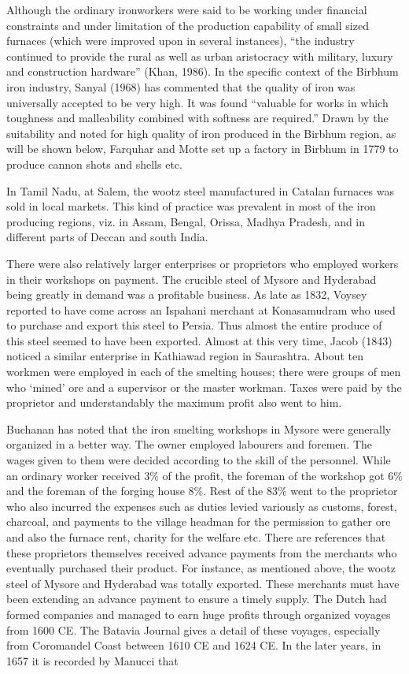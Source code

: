 \newpage

Although the ordinary ironworkers were said to be working under financial constraints and under limitation of the production capability of small sized furnaces (which were improved upon in several instances), “the industry continued to provide the rural as well as urban aristocracy with military, luxury and construction hardware” (Khan, 1986). In the specific context of the Birbhum iron industry, Sanyal (1968) has commented that the quality of iron was universally accepted to be very high. It was found “valuable for works in which toughness and malleability combined with softness are required.” Drawn by the suitability and noted for high quality of iron produced in the Birbhum region, as will be shown below, Farquhar and Motte set up a factory in Birbhum in 1779 to produce cannon shots and shells etc. 

In Tamil Nadu, at Salem, the wootz steel manufactured in Catalan furnaces was sold in local markets. This kind of practice was prevalent in most of the iron producing regions, viz. in Assam, Bengal, Orissa, Madhya Pradesh, and in different parts of Deccan and south India.

There were also relatively larger enterprises or proprietors who employed workers in their workshops on payment. The crucible steel of Mysore and Hyderabad being greatly in demand was a profitable business. As late as 1832, Voysey reported to have come across an Ispahani merchant at Konasamudram who used to purchase and export this steel to Persia. Thus almost the entire produce of this steel seemed to have been exported. Almost at this very time, Jacob (1843) noticed a similar enterprise in Kathiawad region in Saurashtra. About ten workmen were employed in each of the smelting houses; there were groups of men who ‘mined’ ore and a supervisor or the master workman. Taxes were paid by the proprietor and understandably the maximum profit also went to him.

Buchanan has noted that the iron smelting workshops in Mysore were generally organized in a better way. The owner employed labourers and foremen. The wages given to them were decided according to the skill of the personnel. While an ordinary worker received 3\% of the profit, the foreman of the workshop got 6\% and the foreman of the forging house 8\%. Rest of the 83\% went to the proprietor who also incurred the expenses such as duties levied variously as customs, forest, charcoal, and payments to the village headman for the permission to gather ore and also the furnace rent, charity for the welfare etc. There are references that these proprietors themselves received advance payments from the merchants who eventually purchased their product. For instance, as mentioned above, the wootz steel of Mysore and Hyderabad was totally exported. These merchants must have been extending an advance payment to ensure a timely supply. The Dutch had formed companies and managed to earn huge profits through organized voyages from 1600 CE.  The Batavia Journal gives a detail of these voyages, especially from Coromandel Coast between 1610 CE and 1624   CE.  In the later years, in 1657 it is recorded by Manucci that 

